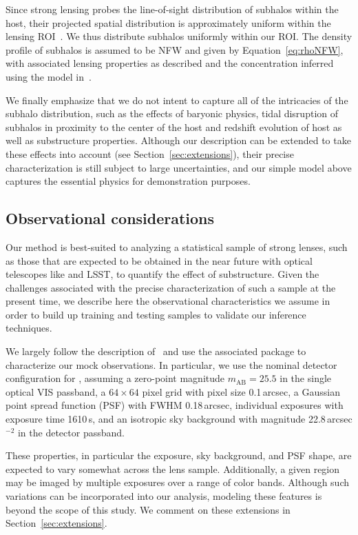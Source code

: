 \documentclass[twocolumn]{aastex63}
\begin{document}
Since strong lensing probes the line-of-sight distribution of subhalos within the host, their projected spatial distribution is approximately uniform within the lensing ROI~\citep{2017MNRAS.469.1997D}. We thus distribute subhalos uniformly within our ROI. The density profile of subhalos is assumed to be NFW and given by Equation~\eqref{eq:rhoNFW}, with associated lensing properties as described and the concentration inferred using the model in~\citet{2014MNRAS.442.2271S}.

We finally emphasize that we do not intent to capture all of the intricacies of the subhalo distribution, such as the effects of baryonic physics, tidal disruption of subhalos in proximity to the center of the host and redshift evolution of host as well as substructure properties. Although our description can be extended to take these effects into account (see Section~\ref{sec:extensions}), their precise characterization is still subject to large uncertainties, and our simple model above captures the essential physics for demonstration purposes.

\subsection{Observational considerations}
\label{sec:observations}

Our method is best-suited to analyzing a statistical sample of strong lenses, such as those that are expected to be obtained in the near future with optical telescopes like \Euclid and LSST, to quantify the effect of substructure. Given the challenges associated with the precise characterization of such a sample at the present time, we describe here the observational characteristics we assume in order to build up training and testing samples to validate our inference techniques.

We largely follow the description of~\citet{2015ApJ...811...20C} and use the associated  package to characterize our mock observations. In particular, we use the nominal detector configuration for \Euclid, assuming a zero-point magnitude $m_\mathrm{AB} = 25.5$ in the single optical VIS passband, a $64\times64$ pixel grid with pixel size 0.1\,arcsec, a Gaussian point spread function (PSF) with FWHM 0.18\,arcsec, individual exposures with exposure time 1610\,s, and an isotropic sky background with magnitude 22.8\,arcsec$^{-2}$ in the detector passband.

These properties, in particular the exposure, sky background, and PSF shape, are expected to vary somewhat across the lens sample. Additionally, a given region may be imaged by multiple exposures over a range of color bands. Although such variations can be incorporated into our analysis, modeling these features is beyond the scope of this study. We comment on these extensions in Section~\ref{sec:extensions}.
\end{document}
